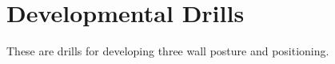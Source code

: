 \section*{Developmental Drills}
These are drills for developing three wall posture and positioning.

